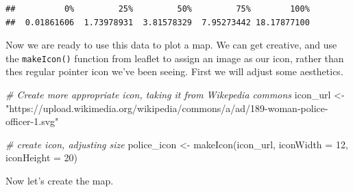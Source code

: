 \documentclass[
]{book}
\newenvironment{Shaded}{\begin{snugshade}}{\end{snugshade}}
\newcommand{\AttributeTok}[1]{\textcolor[rgb]{0.77,0.63,0.00}{#1}}
\newcommand{\CommentTok}[1]{\textcolor[rgb]{0.56,0.35,0.01}{\textit{#1}}}
\newcommand{\ConstantTok}[1]{\textcolor[rgb]{0.00,0.00,0.00}{#1}}
\newcommand{\DecValTok}[1]{\textcolor[rgb]{0.00,0.00,0.81}{#1}}
\newcommand{\FloatTok}[1]{\textcolor[rgb]{0.00,0.00,0.81}{#1}}
\newcommand{\FunctionTok}[1]{\textcolor[rgb]{0.00,0.00,0.00}{#1}}
\newcommand{\NormalTok}[1]{#1}
\newcommand{\OtherTok}[1]{\textcolor[rgb]{0.56,0.35,0.01}{#1}}
\newcommand{\SpecialCharTok}[1]{\textcolor[rgb]{0.00,0.00,0.00}{#1}}
\newcommand{\StringTok}[1]{\textcolor[rgb]{0.31,0.60,0.02}{#1}}
\begin{document}
\begin{verbatim}
##          0%         25%         50%         75%        100% 
##  0.01861606  1.73978931  3.81578329  7.95273442 18.17877100
\end{verbatim}

Now we are ready to use this data to plot a map. We can get creative, and use the \texttt{makeIcon()} function from leaflet to assign an image as our icon, rather than thes regular pointer icon we've been seeing. First we will adjust some aesthetics.

\begin{Shaded}
\begin{Highlighting}[]
\CommentTok{\# Create more appropriate icon, taking it from Wikepedia commons }
\NormalTok{icon\_url }\OtherTok{\textless{}{-}} \StringTok{"https://upload.wikimedia.org/wikipedia/commons/a/ad/189{-}woman{-}police{-}officer{-}1.svg"}

\CommentTok{\# create icon, adjusting size }
\NormalTok{police\_icon }\OtherTok{\textless{}{-}} \FunctionTok{makeIcon}\NormalTok{(icon\_url,}
                        \AttributeTok{iconWidth =} \DecValTok{12}\NormalTok{, }
                        \AttributeTok{iconHeight =} \DecValTok{20}\NormalTok{)}
\end{Highlighting}
\end{Shaded}

\begin{Shaded}
\end{Shaded}

Now let's create the map.
\end{document}
